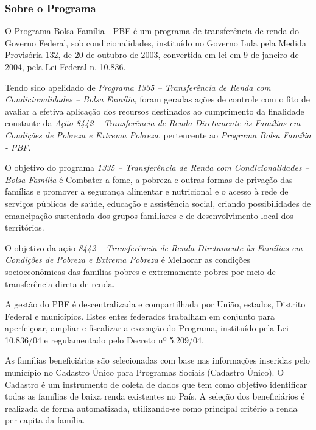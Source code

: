 \documentclass[12pt]{article}
\begin{document}
	\subsubsection{Sobre o Programa}
	\label{sec:bfsobre}
	
	O Programa Bolsa Família - PBF é um programa de transferência de renda do Governo Federal, sob condicionalidades, instituído no Governo Lula pela Medida Provisória 132, de 20 de outubro de 2003, convertida em lei em 9 de janeiro de 2004, pela Lei Federal n. 10.836.
	
	Tendo sido apelidado de \emph{Programa 1335 – Transferência de Renda com Condicionalidades – Bolsa Família}, foram geradas ações de controle com o fito de avaliar a efetiva aplicação dos recursos destinados ao cumprimento da finalidade constante da \emph{Ação 8442 – Transferência de Renda Diretamente às Famílias em Condições de Pobreza e Extrema Pobreza}, pertencente ao \emph{Programa Bolsa Família - PBF}.
	
	O objetivo do programa \emph{1335 – Transferência de Renda com Condicionalidades – Bolsa Família} é Combater a fome, a pobreza e outras formas de privação das famílias e promover a segurança alimentar e nutricional e o acesso à rede de serviços públicos de saúde, educação e assistência social, criando possibilidades de emancipação sustentada dos grupos familiares e de desenvolvimento local dos territórios.
	
	O objetivo da ação \emph{8442 – Transferência de Renda Diretamente às Famílias em Condições de Pobreza e Extrema Pobreza} é Melhorar as condições socioeconômicas das famílias pobres e extremamente pobres por meio de transferência direta de renda.
	
	A gestão do PBF é descentralizada e compartilhada por União, estados, Distrito Federal e municípios. Estes entes federados trabalham em conjunto para aperfeiçoar, ampliar e fiscalizar a execução do Programa, instituído pela Lei 10.836/04 e regulamentado pelo Decreto nº 5.209/04.
	
	As famílias beneficiárias são selecionadas com base nas informações inseridas pelo município no Cadastro Único para Programas Sociais (Cadastro Único). O Cadastro é um instrumento de coleta de dados que tem como objetivo identificar todas as famílias de baixa renda existentes no País. A seleção dos beneficiários é realizada de forma automatizada, utilizando-se como principal critério a renda per capita da família.
	
\end{document}
